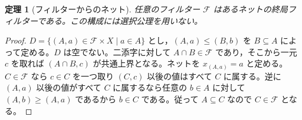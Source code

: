 \documentclass[a5paper,10pt,dvipdfmx]{jsarticle}
\theoremstyle{definition}
\theoremstyle{plain}
\newtheorem{thm}[ruledef]{定理}
\begin{document}
\begin{thm}[フィルターからのネット]\label{k276}
任意のフィルター $\mathcal F$ はあるネットの終局フィルターである。この構成には選択公理を用いない。
\end{thm}
\begin{proof}
$D=\{(A,a)\in\mathcal F\times X\mid a\in A\}$ とし，$(A,a)\leq(B,b)$ を $B\subseteq A$ によって定める。$D$ は空でない。二添字に対して $A\cap B\in\mathcal F$ であり，そこから一元 $c$ を取れば $(A\cap B,c)$ が共通上界となる。ネットを $x_{(A,a)}=a$ と定める。$C\in\mathcal F$ なら $c\in C$ を一つ取り $(C,c)$ 以後の値はすべて $C$ に属する。逆に $(A,a)$ 以後の値がすべて $C$ に属するなら任意の $b\in A$ に対して $(A,b)\geq(A,a)$ であるから $b\in C$ である。従って $A\subseteq C$ なので $C\in\mathcal F$ となる。
\end{proof}
\par\medskip{}
\end{document}
